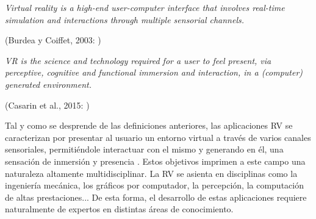 \begin{center}
    \begin{minipage}{0.9\linewidth}
        {\small
\emph{Virtual reality is a high-end user-computer interface that
involves real-time simulation and interactions through
multiple sensorial channels.}
        }
        \begin{flushright}
            (Burdea y Coiffet, 2003: \cite{burdea2003virtual})
        \end{flushright}
    \end{minipage}
    
    \begin{minipage}{0.9\linewidth}
        {\small
\emph{VR is the science and technology required for a user
to feel present, via perceptive, cognitive and functional
immersion and interaction, in a (computer) generated
environment. }
        }
        \begin{flushright}
            (Casarin et al., 2015: \cite{kuntz2015middlevr})
        \end{flushright}
    \end{minipage}
    
\end{center}
%
Tal y como se desprende de las definiciones anteriores, las aplicaciones \ac{RV} se caracterizan por presentar al usuario un entorno virtual a través de varios canales sensoriales, permitiéndole interactuar con el mismo y generando en él, una sensación de inmersión y presencia \cite{Jerald:2015}. Estos objetivos imprimen a este campo una naturaleza altamente multidisciplinar. La \ac{RV} se asienta en disciplinas como la ingeniería mecánica, los gráficos por computador, la percepción, la computación de altas prestaciones... De esta forma, el desarrollo de estas aplicaciones requiere naturalmente de expertos en distintas áreas de conocimiento.  

